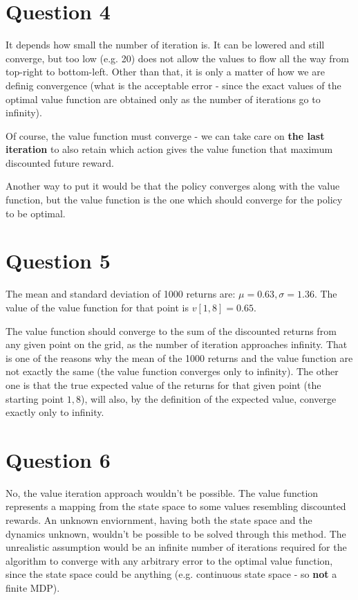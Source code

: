 \documentclass{article}
\begin{document}
\section{Question 4}

It depends how small the number of iteration is. It can be lowered and still converge, but too low (e.g. 20) does not allow the values to flow all the way from top-right to bottom-left. Other than that, it is only a matter of how we are definig convergence (what is the acceptable error - since the exact values of the optimal value function are obtained only as the number of iterations go to infinity).

 Of course, the value function must converge - we can take care on \textbf{the last iteration} to also retain which action gives the value function that maximum discounted future reward.

Another way to put it would be that the policy converges along with the value function, but the value function is the one which should converge for the policy to be optimal.

\section{Question 5}
The mean and standard deviation of 1000 returns are: $\mu = 0.63, \sigma=1.36$. The value of the value function for that point is $v[1,8]=0.65$.

The value function should converge to the sum of the discounted returns from any given point on the grid, as the number of iteration approaches infinity.  That is one of the reasons why the mean of the 1000 returns and the value function are not exactly the same (the value function converges only to infinity). The other one is that the true expected value of the returns for that given point (the starting point $1,8$), will also, by the definition of the expected value, converge exactly only to infinity.

\section{Question 6}

No, the value iteration approach wouldn't be possible. The value function represents a mapping from the state space to some values resembling discounted rewards. An unknown enviornment, having both the state space and the dynamics unknown, wouldn't be possible to be solved through this method. The unrealistic assumption would be an infinite number of iterations required for the algorithm to converge with any arbitrary error to the optimal value function, since the state space could be anything (e.g. continuous state space - so \textbf{not} a finite MDP).
\end{document}
